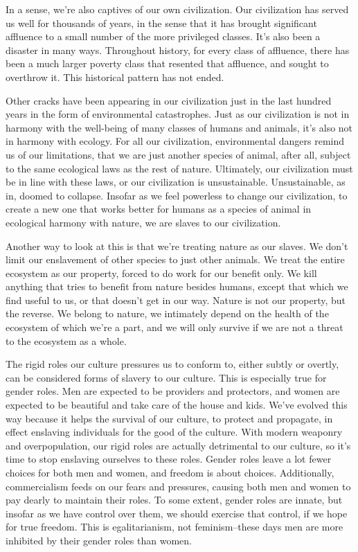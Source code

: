 In a sense, we're also captives of our own civilization. Our civilization has served us well for thousands of years, in the sense that it has brought significant affluence to a small number of the more privileged classes. It's also been a disaster in many ways. Throughout history, for every class of affluence, there has been a much larger poverty class that resented that affluence, and sought to overthrow it. This historical pattern has not ended.

Other cracks have been appearing in our civilization just in the last hundred years in the form of environmental catastrophes. Just as our civilization is not in harmony with the well-being of many classes of humans and animals, it's also not in harmony with ecology. For all our civilization, environmental dangers remind us of our limitations, that we are just another species of animal, after all, subject to the same ecological laws as the rest of nature. Ultimately, our civilization must be in line with these laws, or our civilization is unsustainable. Unsustainable, as in, doomed to collapse. Insofar as we feel powerless to change our civilization, to create a new one that works better for humans as a species of animal in ecological harmony with nature, we are slaves to our civilization.

Another way to look at this is that we're treating nature as our slaves. We don't limit our enslavement of other species to just other animals. We treat the entire ecosystem as our property, forced to do work for our benefit only. We kill anything that tries to benefit from nature besides humans, except that which we find useful to us, or that doesn't get in our way. Nature is not our property, but the reverse. We belong to nature, we intimately depend on the health of the ecosystem of which we're a part, and we will only survive if we are not a threat to the ecosystem as a whole.

The rigid roles our culture pressures us to conform to, either subtly or overtly, can be considered forms of slavery to our culture. This is especially true for gender roles. Men are expected to be providers and protectors, and women are expected to be beautiful and take care of the house and kids. We've evolved this way because it helps the survival of our culture, to protect and propagate, in effect enslaving individuals for the good of the culture. With modern weaponry and overpopulation, our rigid roles are actually detrimental to our culture, so it's time to stop enslaving ourselves to these roles. Gender roles leave a lot fewer choices for both men and women, and freedom is about choices. Additionally, commercialism feeds on our fears and pressures, causing both men and women to pay dearly to maintain their roles. To some extent, gender roles are innate, but insofar as we have control over them, we should exercise that control, if we hope for true freedom. This is egalitarianism, not feminism–these days men are more inhibited by their gender roles than women.

